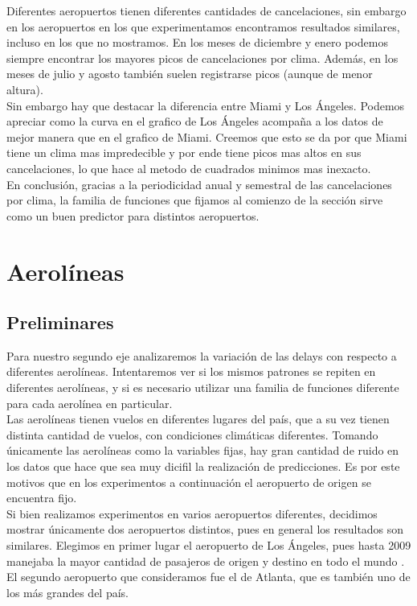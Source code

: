 Diferentes aeropuertos tienen diferentes cantidades de cancelaciones, sin embargo en los aeropuertos en los que experimentamos encontramos resultados similares, incluso en los que no mostramos. En los meses de diciembre y enero podemos siempre encontrar los mayores picos de cancelaciones por clima. Además, en los meses de julio y agosto también suelen registrarse picos (aunque de menor altura). \\

Sin embargo hay que destacar la diferencia entre Miami y Los Ángeles. Podemos apreciar como la curva en el grafico de Los Ángeles acompaña a los datos de mejor manera que en el grafico de Miami. Creemos que esto se da por que Miami tiene un clima mas impredecible y por ende tiene picos mas altos en sus cancelaciones, lo que hace al metodo de cuadrados minimos mas inexacto.\\

En conclusión, gracias a la periodicidad anual y semestral de las cancelaciones por clima, la familia de funciones que fijamos al comienzo de la sección sirve como un buen predictor para distintos aeropuertos. \\

\section{Aerolíneas}

\subsection{Preliminares}
Para nuestro segundo eje analizaremos la variación de las delays con respecto a diferentes aerolíneas. Intentaremos ver si los mismos patrones se repiten en diferentes aerolíneas, y si es necesario utilizar una familia de funciones diferente para cada aerolínea en particular. \\

Las aerolíneas tienen vuelos en diferentes lugares del país, que a su vez tienen distinta cantidad de vuelos, con condiciones climáticas diferentes. Tomando únicamente las aerolíneas como la variables fijas, hay gran cantidad de ruido en los datos que hace que sea muy dicifil la realización de predicciones. Es por este motivos que en los experimentos a continuación el aeropuerto de origen se encuentra fijo. \\

Si bien realizamos experimentos en varios aeropuertos diferentes, decidimos mostrar únicamente dos aeropuertos distintos, pues en general los resultados son similares. Elegimos en primer lugar el aeropuerto de Los Ángeles, pues hasta 2009 manejaba la mayor cantidad de pasajeros de origen y destino en todo el mundo \cite{LosAngelesAeropuerto}. El segundo aeropuerto que consideramos fue el de Atlanta, que es también uno de los más grandes del país. \\

